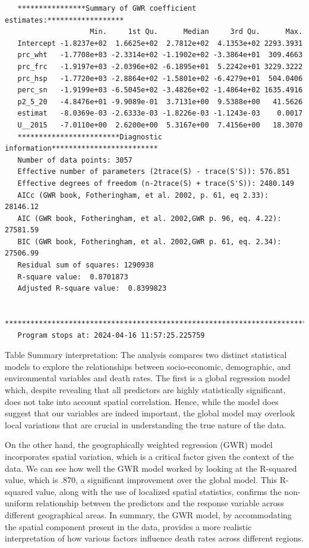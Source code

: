 \documentclass[
]{article}
\begin{document}
\begin{verbatim}
   ****************Summary of GWR coefficient estimates:******************
                    Min.     1st Qu.      Median     3rd Qu.      Max.
   Intercept -1.8237e+02  1.6625e+02  2.7812e+02  4.1353e+02 2293.3931
   prc_wht   -1.7708e+03 -2.3314e+02 -1.1902e+02 -3.3864e+01  309.4663
   prc_frc   -1.9197e+03 -2.0396e+02 -6.1895e+01  5.2242e+01 3229.3222
   prc_hsp   -1.7720e+03 -2.8864e+02 -1.5801e+02 -6.4279e+01  504.0406
   perc_sn   -1.9199e+03 -6.5045e+02 -3.4826e+02 -1.4864e+02 1635.4916
   p2_5_20   -4.8476e+01 -9.9089e-01  3.7131e+00  9.5388e+00   41.5626
   estimat   -8.0369e-03 -2.6333e-03 -1.8226e-03 -1.1243e-03    0.0017
   U__2015   -7.0110e+00  2.6200e+00  5.3167e+00  7.4156e+00   18.3070
   ************************Diagnostic information*************************
   Number of data points: 3057 
   Effective number of parameters (2trace(S) - trace(S'S)): 576.851 
   Effective degrees of freedom (n-2trace(S) + trace(S'S)): 2480.149 
   AICc (GWR book, Fotheringham, et al. 2002, p. 61, eq 2.33): 28146.12 
   AIC (GWR book, Fotheringham, et al. 2002,GWR p. 96, eq. 4.22): 27581.59 
   BIC (GWR book, Fotheringham, et al. 2002,GWR p. 61, eq. 2.34): 27506.99 
   Residual sum of squares: 1290938 
   R-square value:  0.8701873 
   Adjusted R-square value:  0.8399823 

   ***********************************************************************
   Program stops at: 2024-04-16 11:57:25.225759 
\end{verbatim}

Table Summary interpretation: The analysis compares two distinct
statistical models to explore the relationships between socio-economic,
demographic, and environmental variables and death rates. The first is a
global regression model which, despite revealing that all predictors are
highly statistically significant, does not take into account spatial
correlation. Hence, while the model does suggest that our variables are
indeed important, the global model may overlook local variations that
are crucial in understanding the true nature of the data.~

On the other hand, the geographically weighted regression (GWR) model
incorporates spatial variation, which is a critical factor given the
context of the data. We can see how well the GWR model worked by looking
at the R-squared value, which is .870, a significant improvement over
the global model. This R-squared value, along with the use of localized
spatial statistics, confirms the non-uniform relationship between the
predictors and the response variable across different geographical
areas. In summary, the GWR model, by accommodating the spatial component
present in the data, provides a more realistic interpretation of how
various factors influence death rates across different regions.
\end{document}
